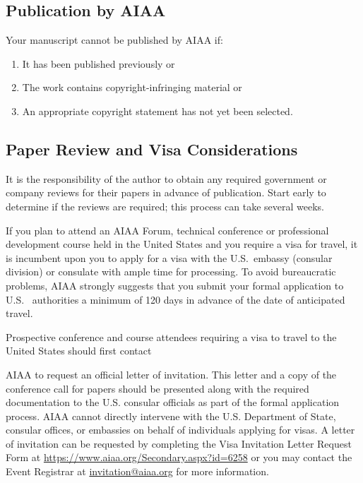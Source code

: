 \documentclass[conf]{new-aiaa}
\begin{document}
\subsection{Publication by AIAA}
Your manuscript cannot be published by AIAA if:
\begin{enumerate}
\item It has been published previously or

\item The work contains copyright-infringing material or

\item An appropriate copyright statement has not yet been selected.
\end{enumerate}

\subsection{Paper Review and Visa Considerations}

It is the responsibility of the author to obtain any required government or company reviews for their papers in advance of publication. Start early to determine if the reviews are required; this process can take several weeks.

If you plan to attend an AIAA Forum, technical conference or professional development course held in the United States and you require a visa for travel, it is incumbent upon you to apply for a visa with the U.S.~embassy (consular division) or consulate with ample time for processing.  To avoid bureaucratic problems, AIAA strongly suggests that you submit your formal application to U.S.~ authorities a minimum of 120 days in advance of the date of anticipated travel.

Prospective conference and course attendees requiring a visa to travel to the United States should first contact

AIAA to request an official letter of invitation. This letter and a copy of the conference call for papers should be presented along with the required documentation to the U.S. consular officials as part of the formal application process.  AIAA cannot directly intervene with the U.S. Department of State, consular offices, or embassies on behalf of individuals applying for visas. A letter of invitation can be requested by completing the Visa Invitation Letter Request Form at \url{https://www.aiaa.org/Secondary.aspx?id=6258} or you may contact the Event Registrar at \url{invitation@aiaa.org} for more information.
\end{document}
